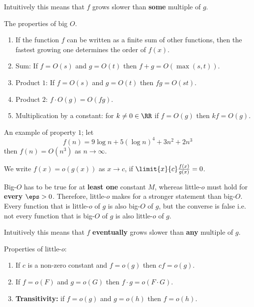 \documentclass[12pt, a4paper]{article}
\begin{document}
\begin{mdnote}
    Intuitively this means that \(f\) grows slower than \textbf{some} multiple of \(g\).
\end{mdnote}

\begin{theorem}
    The properties of big \(O\).
    \begin{enumerate}
        \item If the function \(f\) can be written as a finite sum of other functions, then the fastest growing one determines the order of \(f(x)\).
        \item Sum: If \(f=O(s)\) and \(g=O(t)\) then \(f+g = O(\max(s,t))\).
        \item Product \(1\): If \(f=O(s)\) and \(g=O(t)\) then \(fg=O(st)\).
        \item Product \(2\): \(f\cdot O(g)=O(fg)\).
        \item Multiplication by a constant: for \(k \neq 0\in \RR\) if \(f=O(g)\) then \(kf=O(g)\).
    \end{enumerate}
\end{theorem}

\begin{mdexample}
    An example of property \(1\); let 
    \[f(n)=9\log n+5(\log n)^4+3n^2+2n^3\]
    then \(f(n)=O(n^3)\) as \(n\to \infty\).
\end{mdexample}

\begin{definition}
    We write \(f(x)=o(g(x))\) as \(x\to c\), if \(\limit{x}{c} \frac{f(x)}{g(x)} =0\).
\end{definition}

\begin{mdremark}
    Big-\(O\) has to be true for at \textbf{least one} constant \(M\), whereas little-\(o\) must hold for \textbf{every} \(\eps>0\). Therefore, little-\(o\) makes for a stronger statement than big-\(O\). \\
    Every function that is little-\(o\) of \(g\) is also big-\(O\) of \(g\), but the converse is false i.e. not every function that is big-\(O\) of \(g\) is also little-\(o\) of \(g\).
\end{mdremark}

\begin{mdnote}
    Intuitively this means that \(f\) \textbf{eventually} grows slower than \textbf{any} multiple of \(g\).
\end{mdnote}

\begin{theorem}
    Properties of little-\(o\):
    \begin{enumerate}
        \item If \(c\) is a non-zero constant and \(f=o(g)\) then \(cf=o(g)\).
        \item If \(f=o(F)\) and \(g=o(G)\) then \(f\cdot g=o(F\cdot G)\).
        \item \textbf{Transitivity:} if \(f=o(g)\) and \(g=o(h)\) then \(f=o(h)\).
    \end{enumerate}
\end{theorem}
\end{document}
